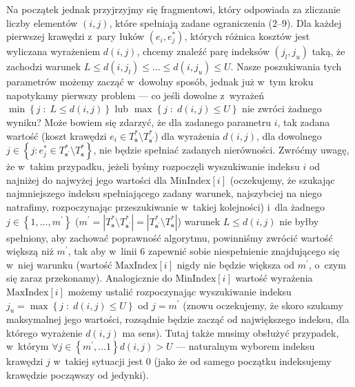 Na początek jednak przyjrzyjmy się fragmentowi, który odpowiada za zliczanie liczby elementów $\left( i, j \right)$, które spełniają zadane ograniczenia ($2$--$9$). Dla każdej pierwszej krawędzi z~pary łuków $\left( e_{i}, e^{\ast}_{j} \right)$, których różnica kosztów jest wyliczana wyrażeniem $d \left( i, j \right)$, chcemy znaleźć parę indeksów $\left( j_{l}, j_{u} \right)$ taką, że zachodzi warunek $L \leqslant d \left( i, j_{l} \right) \leqslant \dots \leqslant d \left( i, j_{u} \right) \leqslant U$. Nasze poszukiwania tych parametrów możemy zacząć w~dowolny sposób, jednak już w~tym kroku napotykamy pierwszy problem --- co jeśli dowolne z~wyrażeń $\min \left\{ j \; : \; L \leqslant d \left( i, j \right) \right\}$ lub $\max \left\{ j \; : \; d \left( i, j \right) \leqslant U \right\}$ nie zwróci żadnego wyniku? Może bowiem się zdarzyć, że dla zadanego parametru $i$, tak zadana wartość (koszt krawędzi $e_{i} \in T^{\ast}_{\textbf{s}} \setminus T^{\ast}_{\textbf{s}^{\prime}}$) dla wyrażenia $d \left( i, j \right)$, dla dowolnego $j \in \left\{ j : e^{\ast}_{j} \in T^{\ast}_{\textbf{s}^{\prime}} \setminus T^{\ast}_{\textbf{s}} \right\}$, nie będzie spełniać zadanych nierówności. Zwróćmy uwagę, że w~takim przypadku, jeżeli byśmy rozpoczęli wyszukiwanie indeksu $i$ od najniżej do najwyżej jego wartości dla $\text{MinIndex} \left[ i \right]$ (oczekujemy, że szukając najmniejszego indeksu spełniającego zadany warunek, najszybciej na niego natrafimy, rozpoczynając przeszukiwanie w~takiej kolejności) i~dla żadnego $j \in \left\{ 1, \dots, m^{\prime} \right\}$ ($m^{\prime} = \left| T^{\ast}_{\textbf{s}} \setminus T^{\ast}_{\textbf{s}^{\prime}} \right| = \left| T^{\ast}_{\textbf{s}^{\prime}} \setminus T^{\ast}_{\textbf{s}} \right|$) warunek $ L \leqslant d \left( i, j \right)$ nie byłby spełniony, aby zachować poprawność algorytmu, powinniśmy zwrócić wartość większą niż $m^{\prime}$, tak aby w~linii $6$ zapewnić sobie niespełnienie znajdującego się w~niej warunku (wartość $\text{MaxIndex} \left[ i \right]$ nigdy nie będzie większa od $m^{\prime}$, o~czym się zaraz przekonamy). Analogicznie do $\text{MinIndex} \left[ i \right]$ wartość wyrażenia $\text{MaxIndex} \left[ i \right]$ możemy ustalić rozpoczynając wyszukiwanie indeksu $j_{u} = \max \left\{ j \; : \; d \left( i, j \right) \leqslant U \right\}$ od $j = m^{\prime}$ (znowu oczekujemy, że skoro szukamy maksymalnej jego wartości, rozsądnie będzie zacząć od największego indeksu, dla którego wyrażenie $d \left( i, j \right)$ ma sens). Tutaj także musimy obsłużyć przypadek, w~którym $\forall j \in \left\{ m^{\prime}, \dots 1 \right\} d \left( i, j \right) > U$ --- naturalnym wyborem indeksu krawędzi $j$ w~takiej sytuacji jest $0$ (jako że od samego początku indeksujemy krawędzie począwszy od jedynki).

